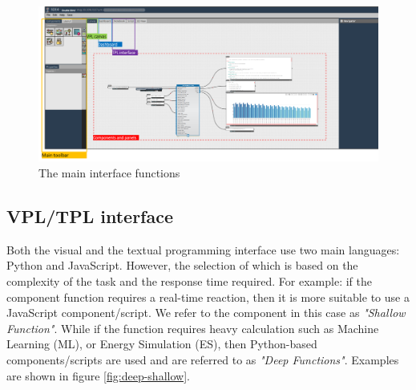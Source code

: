\documentclass{scsSimAUDPaperFormat}
\begin{document}
\begin{figure}[h]
\centering
\includegraphics[width=\linewidth]{imgs/platform_interface.png}
\caption{The main interface functions}
\label{fig:platformInterface}
\end{figure}

\subsection{VPL/TPL interface}
Both the visual and the textual programming interface use two main languages: Python and JavaScript. However, the selection of which is based on the complexity of the task and the response time required. For example: if the component function requires a real-time reaction, then it is more suitable to use a JavaScript component/script. We refer to the component in this case as \textit{"Shallow Function"}. While if the function requires heavy calculation such as Machine Learning (ML), or Energy Simulation (ES), then Python-based components/scripts are used and are referred to as \textit{"Deep Functions"}. Examples are shown in figure \ref{fig:deep-shallow}. 
\end{document}
